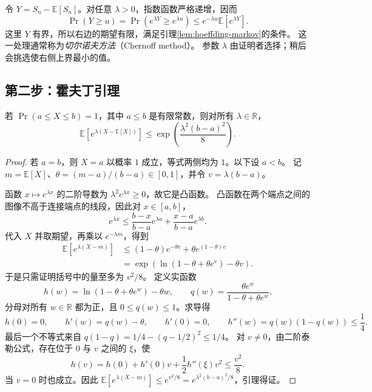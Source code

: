 \documentclass[UTF8,12pt,a4paper,fontset=fandol]{ctexart}
\begin{document}
令 $Y=S_n-\mathbb E[S_n]$。对任意 $\lambda>0$，指数函数严格递增，因而
\begin{equation}
  \Pr(Y\geq u)
  =\Pr(e^{\lambda Y}\geq e^{\lambda u})
  \leq e^{-\lambda u}\mathbb E[e^{\lambda Y}].
  \label{eq:hoeffding-exponential-markov}
\end{equation}
这里 $Y$ 有界，所以右边的期望有限，满足引理\ref{lem:hoeffding-markov}的条件。
这一处理通常称为\emph{切尔诺夫方法}（Chernoff method）。
参数 $\lambda$ 由证明者选择；稍后会挑选使右侧上界最小的值。

\subsection{第二步：霍夫丁引理}

\begin{lemma}[霍夫丁引理]
\label{lem:hoeffding-mgf}
若 $\Pr(a\leq X\leq b)=1$，其中 $a\leq b$ 是有限常数，则对所有 $\lambda\in\mathbb R$，
\begin{equation}
  \mathbb E\!\left[e^{\lambda(X-\mathbb E[X])}\right]
  \leq\exp\!\left(\frac{\lambda^2(b-a)^2}{8}\right).
  \label{eq:hoeffding-lemma}
\end{equation}
\end{lemma}

\begin{proof}
若 $a=b$，则 $X=a$ 以概率 $1$ 成立，等式两侧均为 $1$。以下设 $a<b$。
记 $m=\mathbb E[X]$、$\theta=(m-a)/(b-a)\in[0,1]$，并令 $v=\lambda(b-a)$。

函数 $x\mapsto e^{\lambda x}$ 的二阶导数为 $\lambda^2e^{\lambda x}\geq0$，故它是凸函数。
凸函数在两个端点之间的图像不高于连接端点的线段，因此对 $x\in[a,b]$，
\[
  e^{\lambda x}\leq
  \frac{b-x}{b-a}e^{\lambda a}
  +\frac{x-a}{b-a}e^{\lambda b}.
\]
代入 $X$ 并取期望，再乘以 $e^{-\lambda m}$，得到
\begin{align*}
  \mathbb E[e^{\lambda(X-m)}]
  &\leq (1-\theta)e^{-\theta v}+\theta e^{(1-\theta)v}\\
  &=\exp\!\left(\ln(1-\theta+\theta e^v)-\theta v\right).
\end{align*}
于是只需证明括号中的量至多为 $v^2/8$。
定义实函数
\[
  h(w)=\ln(1-\theta+\theta e^w)-\theta w,
  \qquad q(w)=\frac{\theta e^w}{1-\theta+\theta e^w}.
\]
分母对所有 $w\in\mathbb R$ 都为正，且 $0\leq q(w)\leq1$。求导得
\[
  h(0)=0,\qquad h'(w)=q(w)-\theta,\qquad h'(0)=0,
  \qquad h''(w)=q(w)(1-q(w))\leq\frac14.
\]
最后一个不等式来自 $q(1-q)=1/4-(q-1/2)^2\leq1/4$。
对 $v\ne0$，由二阶泰勒公式，存在位于 $0$ 与 $v$ 之间的 $\xi$，使
\[
  h(v)=h(0)+h'(0)v+\frac12h''(\xi)v^2\leq\frac{v^2}{8}.
\]
当 $v=0$ 时也成立。因此
$\mathbb E[e^{\lambda(X-m)}]\leq e^{v^2/8}
=e^{\lambda^2(b-a)^2/8}$，引理得证。
\end{proof}
\end{document}
